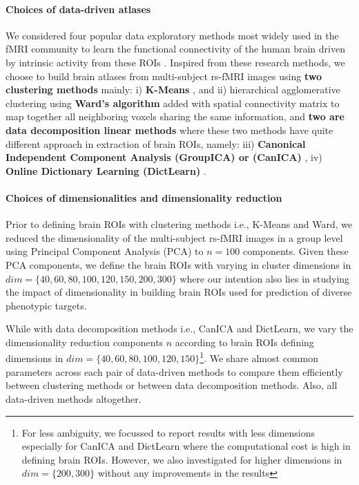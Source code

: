 \documentclass[5p]{elsarticle}
\begin{document}
\paragraph{Choices of data-driven atlases}
We considered four popular data exploratory methods most widely used in the
fMRI community to learn the functional connectivity of the human brain driven
by intrinsic activity from these ROIs \citep{yeo2011, kahnt2012, thirion2014}
\citep{calhoun2001a, beckmann2004, varoquaux2011, abraham2013}.
Inspired from these research methods, we choose to build brain
atlases from multi-subject rs-fMRI images using \textbf{two clustering
methods} mainly:
i) \textbf{K-Means} \citep{sculley2010}, and ii) hierarchical agglomerative
clustering using \textbf{Ward’s algorithm} \citep{ward1963} added with
spatial connectivity matrix to map together all neighboring voxels sharing
the same information, and \textbf{two
are data decomposition linear methods} where these two methods have quite
different approach in extraction of brain ROIs, namely: iii) \textbf{
Canonical Independent Component Analysis (GroupICA) or (CanICA)}
\citep{varoquaux2010}, iv) \textbf{Online Dictionary Learning
(DictLearn)} \citep{mensch2016}.

\paragraph{Choices of dimensionalities and dimensionality reduction}
Prior to defining brain ROIs with clustering methods
i.e., K-Means and Ward, we reduced the dimensionality
of the multi-subject rs-fMRI images in a group level using Principal Component
Analysis (PCA) \citep{smith2014} to $n=100$ components.
Given these PCA components, we define the brain ROIs with
varying in cluster dimensions in $dim=\{40, 60, 80, 100, 120, 150, 200, 300\}$
where our intention also lies in studying the
impact of dimensionality in building brain ROIs used for prediction of
diverse phenotypic targets.

While with data decomposition methods i.e., CanICA and DictLearn,
we vary the dimensionality reduction components $n$
according to brain ROIs defining dimensions in $dim=\{40, 60, 80, 100, 120,
150\}$\footnote{For less ambiguity, we focussed to report results with less
    dimensions especially for CanICA and DictLearn where the computational
    cost is high in defining brain ROIs. However, we also investigated
for higher dimensions in $dim=\{200, 300\}$ without any improvements in the
results}.
We share almost common parameters across each pair of data-driven methods
to compare them efficiently between clustering methods or
between data decomposition methods. Also, all data-driven methods altogether.
\end{document}
